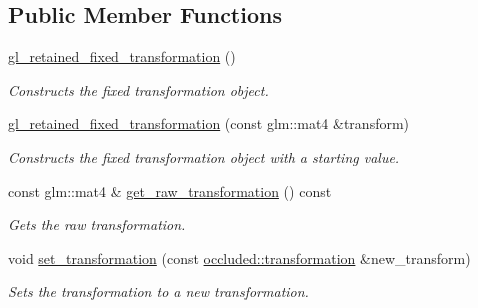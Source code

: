 \subsection*{Public Member Functions}
\begin{DoxyCompactItemize}
\item 
\hyperlink{classoccluded_1_1opengl_1_1retained_1_1scene_1_1nodes_1_1gl__retained__fixed__transformation_a9e5f41a5d6dda9227b50769794ae38b5}{gl\+\_\+retained\+\_\+fixed\+\_\+transformation} ()
\begin{DoxyCompactList}\small\item\em Constructs the fixed transformation object. \end{DoxyCompactList}\item 
\hyperlink{classoccluded_1_1opengl_1_1retained_1_1scene_1_1nodes_1_1gl__retained__fixed__transformation_a01de2384852733cd0d7d92f9e33c42df}{gl\+\_\+retained\+\_\+fixed\+\_\+transformation} (const glm\+::mat4 \&transform)
\begin{DoxyCompactList}\small\item\em Constructs the fixed transformation object with a starting value. \end{DoxyCompactList}\item 
const glm\+::mat4 \& \hyperlink{classoccluded_1_1opengl_1_1retained_1_1scene_1_1nodes_1_1gl__retained__fixed__transformation_a06a7689165f7f18a335fb6295e6d5a7d}{get\+\_\+raw\+\_\+transformation} () const 
\begin{DoxyCompactList}\small\item\em Gets the raw transformation. \end{DoxyCompactList}\item 
void \hyperlink{classoccluded_1_1opengl_1_1retained_1_1scene_1_1nodes_1_1gl__retained__fixed__transformation_ab4041def91fac7f0a7c6790a5ebfef24}{set\+\_\+transformation} (const \hyperlink{classoccluded_1_1scene_1_1nodes_1_1transformation}{occluded\+::transformation} \&new\+\_\+transform)
\begin{DoxyCompactList}\small\item\em Sets the transformation to a new transformation. \end{DoxyCompactList}\end{DoxyCompactItemize}


